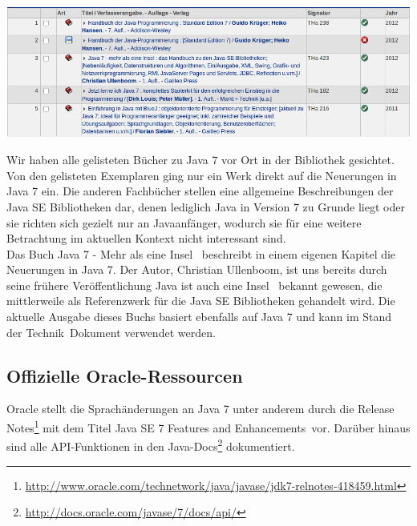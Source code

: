 \begin{center}
\includegraphics[width=\textwidth]{images/dhbw-lib-search-results.png}
\end{center}

Wir haben alle gelisteten Bücher zu Java 7 vor Ort in der Bibliothek gesichtet. Von den gelisteten Exemplaren ging nur ein Werk\cite{javainsel2} direkt auf die Neuerungen in Java 7 ein. Die anderen Fachbücher stellen eine allgemeine Beschreibungen der Java SE Bibliotheken dar, denen lediglich Java in Version 7 zu Grunde liegt\cite{dhLibHandbuchJava} oder sie richten sich gezielt nur an Javaanfänger\cite{dhLibJetztJavaLernen}\cite{dhLibBlueJStart}, wodurch sie für eine weitere Betrachtung im aktuellen Kontext nicht interessant sind.\\

Das Buch \glqq Java 7 - Mehr als eine Insel\grqq\cite{javainsel2} ~beschreibt in einem eigenen Kapitel die Neuerungen in Java 7. Der Autor, Christian Ullenboom, ist uns bereits durch seine frühere Veröffentlichung \glqq Java ist auch eine Insel\grqq\cite{javainsel1} ~bekannt gewesen, die mittlerweile als Referenzwerk für die Java SE Bibliotheken gehandelt wird. Die aktuelle Ausgabe dieses Buchs basiert ebenfalls auf Java 7 und kann im \glqq Stand der Technik\grqq ~Dokument verwendet werden.

\subsection{Offizielle Oracle-Ressourcen}\label{oracle}
Oracle stellt die Sprachänderungen an Java 7 unter anderem durch die Release
Notes\footnote{\url{http://www.oracle.com/technetwork/java/javase/jdk7-relnotes-418459.html}} mit dem Titel 
\glqq Java SE 7 Features and Enhancements\grqq\cite{oracleJavaRel}~vor. Darüber hinaus sind alle API-Funktionen in den 
Java-Docs\footnote{\url{http://docs.oracle.com/javase/7/docs/api/}}\cite{javadocs} dokumentiert.\\

